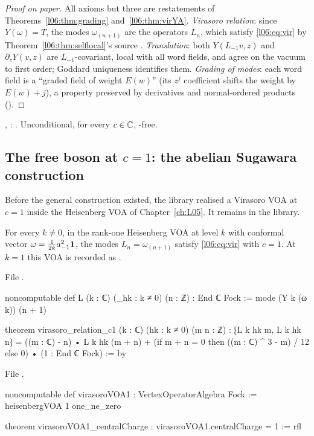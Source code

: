 \begin{proof}[Proof on paper]
All axioms but three are restatements of Theorems~\ref{l06:thm:grading} and~\ref{l06:thm:virYA}.
\emph{Virasoro relation}: since $Y(\omega) = T$, the modes $\omega_{(n+1)}$ are the operators $L_n$, which
satisfy \eqref{l06:eq:vir} by Theorem~\ref{l06:thm:selflocal}'s source .
\emph{Translation}: both $Y(L_{-1}v,z)$ and $\partial_zY(v,z)$ are $L_{-1}$-covariant, local with all word
fields, and agree on the vacuum to first order; Goddard uniqueness identifies them.
\emph{Grading of modes}: each word field is a ``graded field of weight $E(w)$'' (its $z^j$ coefficient
shifts the weight by $E(w)+j$), a property preserved by derivatives and normal-ordered products
().
\end{proof}

\begin{status}
\allowbreak{}\allowbreak{}, \allowbreak{}\allowbreak{}\allowbreak{}\allowbreak{}:
\lean{[propext, Classical.}\allowbreak{}\allowbreak\lean{sound]}. Unconditional, for every $c\in{\mathbb{C}}$, -free.
\end{status}

\subsection{The free boson at \texorpdfstring{$c = 1$}{c = 1}: the abelian Sugawara construction}\label{l06:sec:sugawara}

Before the general construction existed, the library realised a Virasoro VOA at $c = 1$ inside the
Heisenberg VOA of Chapter~\ref{ch:L05}. It remains in the library.

\begin{theorem}[Sugawara at $c = 1$]\label{l06:thm:sugawara}
For every $k\ne0$, in the rank-one Heisenberg VOA at level $k$ with conformal vector
$\omega = \frac1{2k}a_{-1}^2\mathbf{1}$, the modes $L_n = \omega_{(n+1)}$ satisfy \eqref{l06:eq:vir} with
$c = 1$. At $k = 1$ this VOA is recorded as .
\end{theorem}

File .
\begin{leancode}
noncomputable def L (k : ℂ) (_hk : k ≠ 0) (n : ℤ) : End ℂ Fock :=
  mode (Y k (ω k)) (n + 1)

theorem virasoro_relation_c1 (k : ℂ) (hk : k ≠ 0) (m n : ℤ) :
    ⁅L k hk m, L k hk n⁆
      = ((m : ℂ) - n) • L k hk (m + n)
        + (if m + n = 0 then ((m : ℂ) ^ 3 - m) / 12 else 0) • (1 : End ℂ Fock) := by
\end{leancode}
File .
\begin{leancode}
noncomputable def virasoroVOA1 : VertexOperatorAlgebra Fock :=
  heisenbergVOA 1 one_ne_zero

theorem virasoroVOA1_centralCharge : virasoroVOA1.centralCharge = 1 := rfl
\end{leancode}


